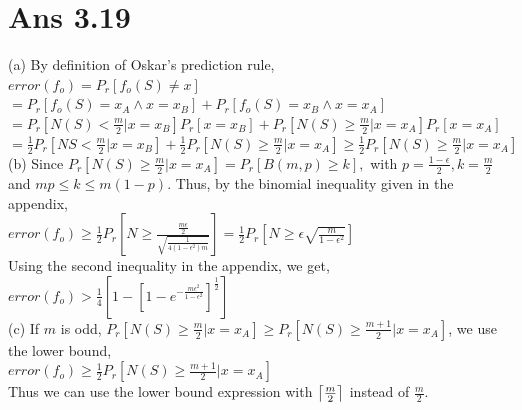 \documentclass[10pt]{article}
\DeclarePairedDelimiter\ceil{\lceil}{\rceil}
\begin{document}
\section*{Ans 3.19}
\begin{flushleft}
(a) By definition of Oskar's prediction rule,\\
\vspace{0.5em}
\hspace{2em}$error(f_{o}) = P_{r}[f_{o}(S) \neq x]$\\
\hspace{5.7em} $= P_{r}[f_{o}(S) = x_{A} \land x = x_{B}] + P_{r}[f_{o}(S) = x_{B} \land x = x_{A}]$\\
\hspace{5.7em} $= P_{r}[N(S) < \frac{m}{2} \lvert x= x_{B}] P_{r}[x = x_{B}] + P_{r}[N(S) \geq \frac{m}{2} \lvert x = x_{A}] P_{r}[x = x_{A}]$\\
\hspace{5.7em} $= \frac{1}{2}P_{r}[N{S} < \frac{m}{2} \lvert x = x_{B}] + \frac{1}{2}P_{r}[N(S) \geq \frac{m}{2} \lvert x = x_{A}] \geq \frac{1}{2} P_{r}[N(S) \geq \frac{m}{2} \lvert x = x_{A}]$\\
\vspace{0.5em}
(b) Since $P_{r}[N(S) \geq \frac{m}{2} \lvert x = x_{A}] = P_{r}[B(m,p) \geq k],$ with $p = \frac{1-\epsilon}{2}, k = \frac{m}{2}$ and $mp \leq k \leq m(1-p)$. Thus, by the binomial inequality given in the appendix, \\
\hspace{2em} $error(f_{o}) \geq \frac{1}{2}P_{r}[N \geq \frac{\frac{m\epsilon}{2}}{\sqrt{\frac{1}{4(1- \epsilon^{2})m}}}] = \frac{1}{2} P_{r} [N \geq \epsilon \sqrt{\frac{m}{1 - \epsilon^{2}}}]$\\
Using the second inequality in the appendix, we get,\\
\hspace{5.7em} $error(f_{o}) > \frac{1}{4} [1 - [1 - e^{- \frac{m\epsilon^{2}}{1 - \epsilon^{2}}}]^{\frac{1}{2}}]$\\
\vspace{0.5em}
(c) If $m$ is odd, $P_{r}[N(S) \geq \frac{m}{2} \lvert x = x_{A}] \geq P_{r}[N(S) \geq \frac{m+1}{2} \lvert x = x_{A}]$, we use the lower bound, \\
\hspace{2em} $error(f_{o}) \geq \frac{1}{2} P_{r} [N(S) \geq \frac{m+1}{2} \lvert x = x_{A}]$\\
Thus we can use the lower bound expression with $\ceil*{\frac{m}{2}}$ instead of $\frac{m}{2}$.\\

\end{flushleft}
\end{document}
